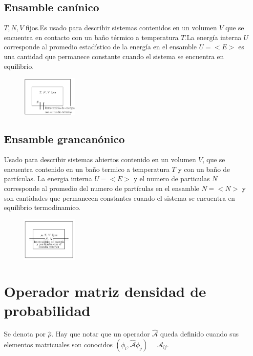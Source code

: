 \documentclass{article}
\begin{document}
\subsection{Ensamble canínico }
$ T,N,V  $ fijos.Es usado para describir sistemas contenidos en un volumen $ V  $ que se encuentra en contacto con un baño térmico a temperatura $ T  $.La energía interna $ U  $ corresponde al promedio estadístico de la energía en el ensamble $ U = <E>  $ es una cantidad que permanece constante cuando el sistema se encuentra en equilibrio.
\begin{figure}[H]
  \begin{center}
    \includegraphics[width=0.25\textwidth]{canonico.png}
  \end{center}
\end{figure}
\subsection{Ensamble grancanónico }
Usado para describir sistemas abiertos contenido en un volumen $ V  $, que se encuentra contenido en un baño termico a temperatura $ T  $ y con un baño de partículas. La energia interna $ U  =<E>$ y el numero de particulas $ N  $ corresponde al promedio del numero de partículas en el ensamble $ N = <N>  $ y son cantidades que permanecen constantes cuando el sistema se encuentra en equilibrio termodinamico.
\begin{figure}[H]
  \begin{center}
    \includegraphics[width=0.25\textwidth]{grancanonico.png}
  \end{center}
\end{figure}

\section{Operador matriz densidad de probabilidad }
Se denota por $ \hat \rho  $. Hay que notar que un operador $ \hat{\mathcal A } $ queda definido cuando sus elementos matricuales son conocidos $ (\phi_l , \hat{\mathcal A }\phi_j) = \mathcal A _{lj } $.
\end{document}
